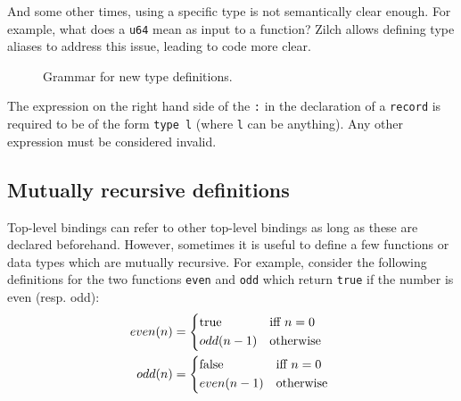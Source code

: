 And some other times, using a specific type is not semantically clear enough.
For example, what does a \texttt{u64} mean as input to a function?
Zilch allows defining type aliases to address this issue, leading to code more clear.

\begin{figure}[H]
	\centering


	\caption{Grammar for new type definitions.}
	\label{fig:zilch-grammar-declarations-type-grammar}
\end{figure}

\begin{warningbox}
	The expression on the right hand side of the \texttt{:} in the declaration of a \texttt{record} is required to be of the form \texttt{type l} (where \texttt{l} can be anything).
	Any other expression must be considered invalid.
\end{warningbox}

\subsection{Mutually recursive definitions}\label{subsec:zilch-grammar-declarations-mutual}

Top-level bindings can refer to other top-level bindings as long as these are declared beforehand.
However, sometimes it is useful to define a few functions or data types which are mutually recursive.
For example, consider the following definitions for the two functions \texttt{even} and \texttt{odd} which return \texttt{true} if the number is even (resp. odd):
\begin{align*}
	even(n) & = \begin{cases*}
		            \mathrm{true} & iff $n = 0$ \\
		            odd(n - 1)    & otherwise
	            \end{cases*}  \\
	odd(n)  & = \begin{cases*}
		            \mathrm{false} & iff $n = 0$ \\
		            even(n - 1)    & otherwise
	            \end{cases*}
\end{align*}

